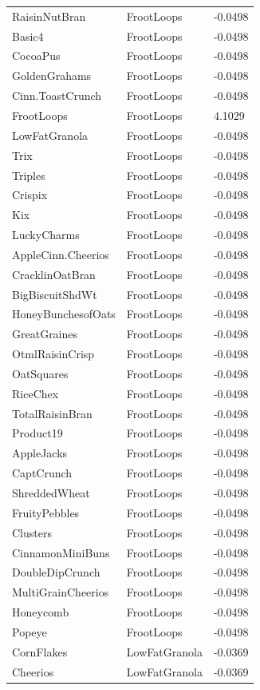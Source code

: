 \begin{table}[!htbp]
\begin{tabular}{lll}
RaisinNutBran & FrootLoops & -0.0498
\\
Basic4 & FrootLoops & -0.0498
\\
CocoaPus & FrootLoops & -0.0498
\\
GoldenGrahams & FrootLoops & -0.0498
\\
Cinn.ToastCrunch & FrootLoops & -0.0498
\\
FrootLoops & FrootLoops & 4.1029
\\
LowFatGranola & FrootLoops & -0.0498
\\
Trix & FrootLoops & -0.0498
\\
Triples & FrootLoops & -0.0498
\\
Crispix & FrootLoops & -0.0498
\\
Kix & FrootLoops & -0.0498
\\
LuckyCharms & FrootLoops & -0.0498
\\
AppleCinn.Cheerios & FrootLoops & -0.0498
\\
CracklinOatBran & FrootLoops & -0.0498
\\
BigBiscuitShdWt & FrootLoops & -0.0498
\\
HoneyBunchesofOats & FrootLoops & -0.0498
\\
GreatGraines & FrootLoops & -0.0498
\\
OtmlRaisinCrisp & FrootLoops & -0.0498
\\
OatSquares & FrootLoops & -0.0498
\\
RiceChex & FrootLoops & -0.0498
\\
TotalRaisinBran & FrootLoops & -0.0498
\\
Product19 & FrootLoops & -0.0498
\\
AppleJacks & FrootLoops & -0.0498
\\
CaptCrunch & FrootLoops & -0.0498
\\
ShreddedWheat & FrootLoops & -0.0498
\\
FruityPebbles & FrootLoops & -0.0498
\\
Clusters & FrootLoops & -0.0498
\\
CinnamonMiniBuns & FrootLoops & -0.0498
\\
DoubleDipCrunch & FrootLoops & -0.0498
\\
MultiGrainCheerios & FrootLoops & -0.0498
\\
Honeycomb & FrootLoops & -0.0498
\\
Popeye & FrootLoops & -0.0498
\\
CornFlakes & LowFatGranola & -0.0369
\\
Cheerios & LowFatGranola & -0.0369

\end{tabular}
\end{table}
